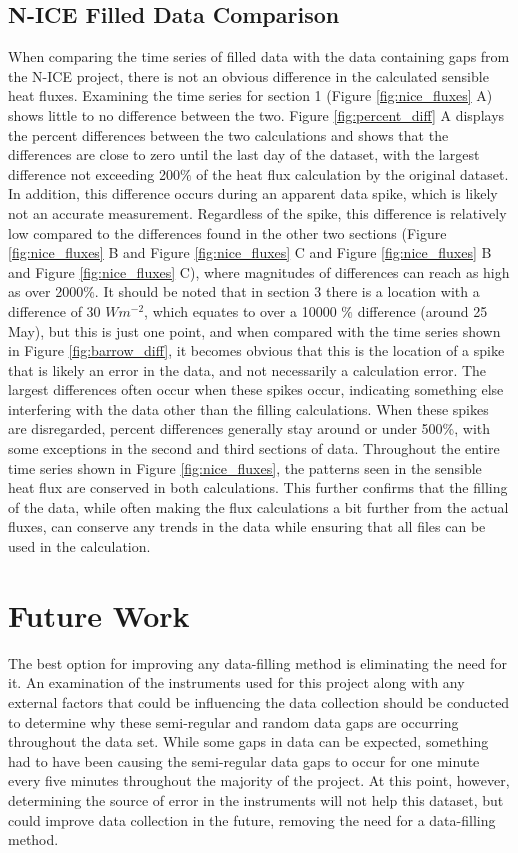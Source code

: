 \subsection{N-ICE Filled Data Comparison}
When comparing the time series of filled data with the data containing gaps from the N-ICE project, there is not an obvious difference in the calculated sensible heat fluxes. Examining the time series for section 1 (Figure \ref{fig:nice_fluxes} A) shows little to no difference between the two. Figure \ref{fig:percent_diff} A displays the percent differences between the two calculations and shows that the differences are close to zero until the last day of the dataset, with the largest difference not exceeding 200$\%$ of the heat flux calculation by the original dataset. In addition, this difference occurs during an apparent data spike, which is likely not an accurate measurement. Regardless of the spike, this difference is relatively low compared to the differences found in the other two sections (Figure \ref{fig:nice_fluxes} B and Figure \ref{fig:nice_fluxes} C and Figure \ref{fig:nice_fluxes} B and Figure \ref{fig:nice_fluxes} C), where magnitudes of differences can reach as high as over 2000$\%$. It should be noted that in section 3 there is a location with a difference of 30 $Wm^{-2}$, which equates to over a 10000 $\%$ difference (around 25 May), but this is just one point, and when compared with the time series shown in Figure \ref{fig:barrow_diff}, it becomes obvious that this is the location of a spike that is likely an error in the data, and not necessarily a calculation error. The largest differences often occur when these spikes occur, indicating something else interfering with the data other than the filling calculations. When these spikes are disregarded, percent differences generally stay around or under 500$\%$, with some exceptions in the second and third sections of data. Throughout the entire time series shown in Figure \ref{fig:nice_fluxes}, the patterns seen in the sensible heat flux are conserved in both calculations. This further confirms that the filling of the data, while often making the flux calculations a bit further from the actual fluxes, can conserve any trends in the data while ensuring that all files can be used in the calculation. 

 \section{Future Work}
The best option for improving any data-filling method is eliminating the need for it. An examination of the instruments used for this project along with any external factors that could be influencing the data collection should be conducted to determine why these semi-regular and random data gaps are occurring throughout the data set. While some gaps in data can be expected, something had to have been causing the semi-regular data gaps to occur for one minute every five minutes throughout the majority of the project. At this point, however, determining the source of error in the instruments will not help this dataset, but could improve data collection in the future, removing the need for a data-filling method.

